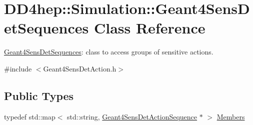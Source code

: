 \hypertarget{class_d_d4hep_1_1_simulation_1_1_geant4_sens_det_sequences}{
\section{DD4hep::Simulation::Geant4SensDetSequences Class Reference}
\label{class_d_d4hep_1_1_simulation_1_1_geant4_sens_det_sequences}
}


\hyperlink{class_d_d4hep_1_1_simulation_1_1_geant4_sens_det_sequences}{Geant4SensDetSequences}: class to access groups of sensitive actions.  


{\ttfamily \#include $<$Geant4SensDetAction.h$>$}\subsection*{Public Types}
\begin{DoxyCompactItemize}
\item 
typedef std::map$<$ std::string, \hyperlink{class_d_d4hep_1_1_simulation_1_1_geant4_sens_det_action_sequence}{Geant4SensDetActionSequence} $\ast$ $>$ \hyperlink{class_d_d4hep_1_1_simulation_1_1_geant4_sens_det_sequences_a2266138a517dd9b784af9234312fdd12}{Members}
\end{DoxyCompactItemize}
